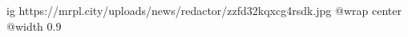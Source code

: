  
 
 
 
 

\ifcmt
  ig https://mrpl.city/uploads/news/redactor/zzfd32kqxcg4rsdk.jpg
  @wrap center
  @width 0.9
\fi
